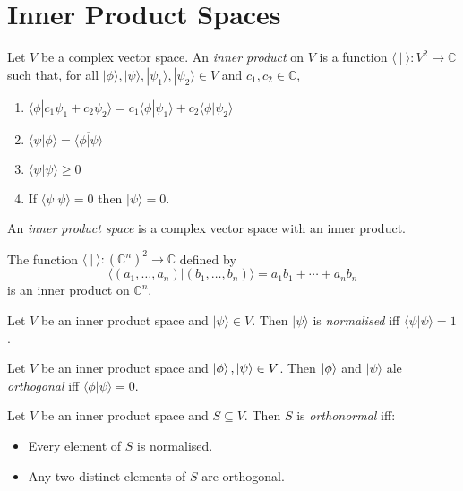 \section{Inner Product Spaces}

\begin{df}
Let $V$ be a complex vector space. An \emph{inner product} on $V$ is a function $\langle \ | \ \rangle : V^2 \rightarrow \mathbb{C}$ such that, for all $|\phi\rangle, |\psi\rangle, |\psi_1 \rangle, | \psi_2 \rangle \in V$ and $c_1, c_2 \in \mathbb{C}$,
\begin{enumerate}
\item $\langle \phi | c_1 \psi_1 + c_2 \psi_2 \rangle = c_1 \langle \phi | \psi_1 \rangle + c_2 \langle \phi | \psi_2 \rangle$
\item $\langle \psi | \phi \rangle = \overline{\langle \phi | \psi \rangle}$
\item $\langle \psi | \psi \rangle \geq 0$
\item If $\langle \psi | \psi \rangle = 0$ then $|\psi\rangle = 0$.
\end{enumerate}

An \emph{inner product space} is a complex vector space with an inner product.
\end{df}

\begin{ex}
The function $\langle \ | \ \rangle : (\mathbb{C}^n)^2 \rightarrow \mathbb{C}$ defined by
\[ \langle (a_1, \ldots, a_n) | (b_1, \ldots, b_n) \rangle = \overline{a_1} b_1 + \cdots + \overline{a_n} b_n \]
is an inner product on $\mathbb{C}^n$.
\end{ex}

\begin{df}[Normalised]
Let $V$ be an inner product space and $|\psi\rangle \in V$. Then $|\psi\rangle$ is \emph{normalised} iff $\langle \psi | \psi \rangle = 1$.
\end{df} 

\begin{df}[Orthogonal]
Let $V$ be an inner product space and $\left| {\phi} \right\rangle, |\psi\rangle \in V$. Then $\left| {\phi} \right\rangle$ and $|\psi\rangle$ ale \emph{orthogonal} iff $\langle \phi | \psi \rangle = 0$.
\end{df} 

\begin{df}[Orthonormal]
Let $V$ be an inner product space and $S \subseteq V$. Then $S$ is \emph{orthonormal} iff:
\begin{itemize}
\item Every element of $S$ is normalised.
\item Any two distinct elements of $S$ are orthogonal.
\end{itemize}
\end{df}

